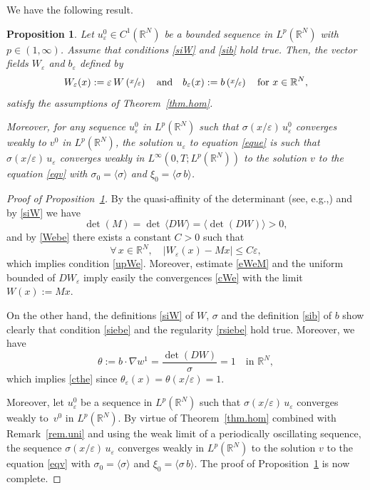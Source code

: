 \documentclass[11pt]{article}
\newcommand{\eg}{e.g.,\xspace}
\def \RR {\mathbb R}
\theoremstyle{plain}
\newtheorem{Pro}[Thm]{Proposition}
\theoremstyle{definition}
\numberwithin{equation}{section}
\begin{document}
We have the following result.
\begin{Pro}\label{pro.per}
Let $u_\varepsilon^0\in C^1(\RR^N)$ be a bounded sequence in $L^p(\RR^N)$ with $p\in(1,\infty)$.
Assume that conditions \eqref{siW} and \eqref{sib} hold true.
Then, the vector fields $W_\varepsilon$ and $b_\varepsilon$ defined by
\begin{equation}\label{Webe}
W_\varepsilon(x):=\varepsilon\,W\left(\sfrac{x}{\varepsilon}\right)\quad\mbox{and}\quad b_\varepsilon(x):=b\left(\sfrac{x}{\varepsilon}\right)\quad\mbox{for }x\in\RR^N,
\end{equation}
satisfy the assumptions of Theorem~\ref{thm.hom}.

Moreover, for any sequence $u_\varepsilon^0$ in $L^p(\RR^N)$ such that $\sigma(x/\varepsilon)\,u_\varepsilon^0$ converges weakly to $v^0$ in $L^p(\RR^N)$, the solution $u_\varepsilon$ to equation \eqref{eque} is such that $\sigma(x/\varepsilon)\,u_\varepsilon$ converges weakly in $L^\infty(0,T;L^p(\RR^N))$ to the solution $v$ to the equation \eqref{eqv} with $\sigma_0=\langle\sigma\rangle$ and $\xi_0=\langle\sigma\,b\rangle$.
\end{Pro}

\begin{proof}[Proof of Proposition~\ref{pro.per}]
By the quasi-affinity of the determinant (see, \eg \cite[\S 4.3.2]{Dac}) and by \eqref{siW} we have
\[
\det(M)=\det\,\langle DW\rangle=\big\langle \det(DW)\big\rangle >0,
\]
and by \eqref{Webe} there exists a constant $C>0$ such that
\begin{equation}\label{eWeM}
\forall\,x\in\RR^N,\quad |W_\varepsilon(x)-Mx| \leq C\varepsilon,
\end{equation}
which implies condition \eqref{upWe}.
Moreover, estimate \eqref{eWeM} and the uniform bounded of $DW_\varepsilon$ imply easily the convergences \eqref{cWe} with the limit $W(x):=Mx$.

On the other hand, the definitions \eqref{siW} of $W$, $\sigma$ and the definition \eqref{sib} of $b$ show clearly that condition \eqref{siebe} and the regularity \eqref{rsiebe} hold true.
Moreover, we have
\[
\theta:=b\cdot\nabla w^1= \dfrac{\det(DW)}{\sigma}=1\quad\mbox{in }\RR^N,
\]
which implies \eqref{cthe} since $\theta_\varepsilon(x)=\theta(x/\varepsilon)=1$.

Moreover, let $u_\varepsilon^0$ be a sequence in $L^p(\RR^N)$ such that $\sigma(x/\varepsilon)\,u_\varepsilon$ converges weakly to~$v^0$ in $L^p(\RR^N)$. By virtue of Theorem~\ref{thm.hom} combined with Remark~\ref{rem.uni} and using the weak limit of a periodically oscillating sequence, the sequence $\sigma(x/\varepsilon)\,u_\varepsilon$ converges weakly in $L^p(\RR^N)$ to the solution $v$ to the equation \eqref{eqv} with $\sigma_0=\langle\sigma\rangle$ and $\xi_0=\langle\sigma\,b\rangle$.
The proof of Proposition~\ref{pro.per} is now complete.
\end{proof}
\end{document}

